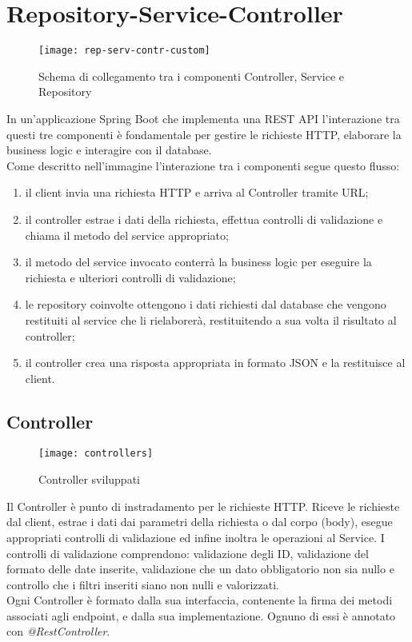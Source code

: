 \section{Repository-Service-Controller}

\begin{figure}[H] 
    \centering 
    \texttt{[image: rep-serv-contr-custom]} 
    \caption{Schema di collegamento tra i componenti Controller, Service e Repository}
\end{figure}

\noindent In un'applicazione Spring Boot che implementa una REST API l'interazione tra questi tre componenti è fondamentale per gestire le richieste HTTP, elaborare la business logic e interagire con il database.\\
Come descritto nell'immagine l'interazione tra i componenti segue questo flusso:
\begin{enumerate}
\item il client invia una richiesta HTTP e arriva al Controller tramite URL;
\item il controller estrae i dati della richiesta, effettua controlli di validazione e chiama il metodo del service appropriato;
\item il metodo del service invocato conterrà la business logic per eseguire la richiesta e ulteriori controlli di validazione;
\item le repository coinvolte ottengono i dati richiesti dal database che vengono restituiti al service che li rielaborerà, restituitendo a sua volta il risultato al controller;
\item il controller crea una risposta appropriata in formato JSON e la restituisce al client.
\end{enumerate}

\subsection{Controller}
\begin{figure}[H] 
    \centering 
    \texttt{[image: controllers]} 
    \caption{Controller sviluppati}
\end{figure}
Il Controller è punto di instradamento per le richieste HTTP. Riceve le richieste dal client, estrae i dati dai parametri della richiesta o dal corpo (body), esegue appropriati controlli di validazione ed infine inoltra le operazioni al Service. I controlli di validazione comprendono: validazione degli ID, validazione del formato delle date inserite, validazione che un dato obbligatorio non sia nullo e controllo che i filtri inseriti siano non nulli e valorizzati.\\
Ogni Controller è formato dalla sua interfaccia, contenente la firma dei metodi associati agli endpoint, e dalla sua implementazione. Ognuno di essi è annotato con \textit{@RestController}.

